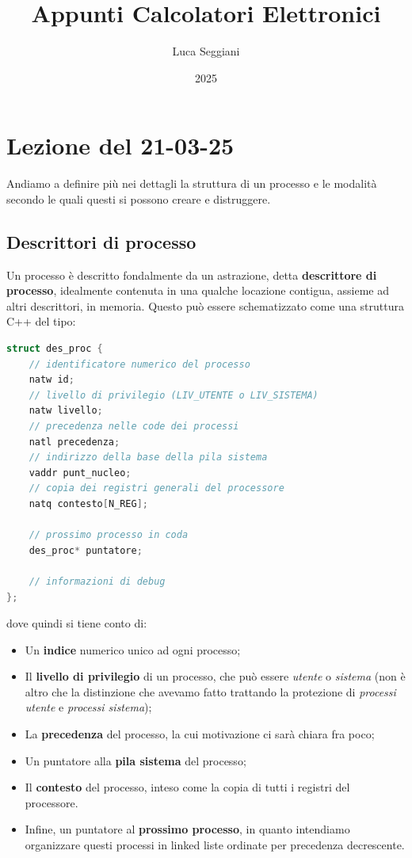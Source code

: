 \documentclass[a4paper,11pt]{article}
\title{Appunti Calcolatori Elettronici}
\author{Luca Seggiani}
\date{2025}
\begin{document}
\section{Lezione del 21-03-25}

\thispagestyle{empty}
\pagestyle{fancy}

Andiamo a definire più nei dettagli la struttura di un processo e le modalità secondo le quali questi si possono creare e distruggere.

\subsection{Descrittori di processo}
Un processo è descritto fondalmente da un astrazione, detta \textbf{descrittore di processo}, idealmente contenuta in una qualche locazione contigua, assieme ad altri descrittori, in memoria.
Questo può essere schematizzato come una struttura C++ del tipo:
\begin{lstlisting}[language=C++, style=codestyle]	
struct des_proc {
	// identificatore numerico del processo
	natw id;
	// livello di privilegio (LIV_UTENTE o LIV_SISTEMA)
	natw livello;
	// precedenza nelle code dei processi
	natl precedenza;
	// indirizzo della base della pila sistema
	vaddr punt_nucleo;
	// copia dei registri generali del processore
	natq contesto[N_REG];

	// prossimo processo in coda
	des_proc* puntatore;

	// informazioni di debug
};
\end{lstlisting}
dove quindi si tiene conto di:
\begin{itemize}
	\item Un \textbf{indice} numerico unico ad ogni processo;
	\item Il \textbf{livello di privilegio} di un processo, che può essere \textit{utente} o \textit{sistema} (non è altro che la distinzione che avevamo fatto trattando la protezione di \textit{processi utente} e \textit{processi sistema});
	\item La \textbf{precedenza} del processo, la cui motivazione ci sarà chiara fra poco;
	\item Un puntatore alla \textbf{pila sistema} del processo;
	\item Il \textbf{contesto} del processo, inteso come la copia di tutti i registri del processore. 
	\item Infine, un puntatore al \textbf{prossimo processo}, in quanto intendiamo organizzare questi processi in linked liste ordinate per precedenza decrescente.
\end{itemize}
\end{document}
